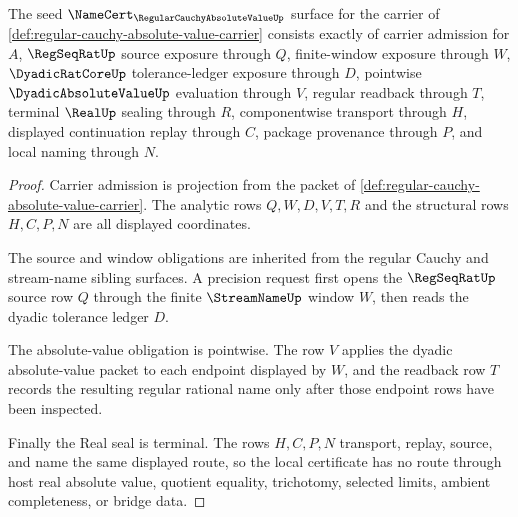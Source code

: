 \begin{theorem}
\label{thm:regular-cauchy-absolute-value-namecert-obligations}
The seed $\NameCert_{\RegularCauchyAbsoluteValueUp}$ surface for the carrier of \autoref{def:regular-cauchy-absolute-value-carrier} consists exactly of carrier admission for $A$, $\RegSeqRatUp$ source exposure through $Q$, finite-window exposure through $W$, $\DyadicRatCoreUp$ tolerance-ledger exposure through $D$, pointwise $\DyadicAbsoluteValueUp$ evaluation through $V$, regular readback through $T$, terminal $\RealUp$ sealing through $R$, componentwise transport through $H$, displayed continuation replay through $C$, package provenance through $P$, and local naming through $N$.
\end{theorem}
\begin{proof}
Carrier admission is projection from the packet of \autoref{def:regular-cauchy-absolute-value-carrier}. The analytic rows $Q,W,D,V,T,R$ and the structural rows $H,C,P,N$ are all displayed coordinates.

The source and window obligations are inherited from the regular Cauchy and stream-name sibling surfaces. A precision request first opens the $\RegSeqRatUp$ source row $Q$ through the finite $\StreamNameUp$ window $W$, then reads the dyadic tolerance ledger $D$.

The absolute-value obligation is pointwise. The row $V$ applies the dyadic absolute-value packet to each endpoint displayed by $W$, and the readback row $T$ records the resulting regular rational name only after those endpoint rows have been inspected.

Finally the Real seal is terminal. The rows $H,C,P,N$ transport, replay, source, and name the same displayed route, so the local certificate has no route through host real absolute value, quotient equality, trichotomy, selected limits, ambient completeness, or bridge data.
\end{proof}

